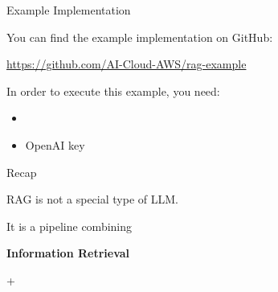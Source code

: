 \documentclass[aspectratio=169]{beamer}
\begin{document}
\begin{fragile}{Example Implementation}

You can find the example implementation on GitHub: 

\url{https://github.com/AI-Cloud-AWS/rag-example}

In order to execute this example, you need:
    \begin{itemize}
        \item 
        \item OpenAI key 
    \end{itemize}




\begin{frame}{Recap}

\begin{center}

\Huge
RAG is not a special type of LLM.

\vspace{0.5cm}

\Large
It is a pipeline combining

\vspace{0.3cm}

\textbf{Information Retrieval}

\vspace{0.2cm}

+

\vspace{0.2cm}


\end{center}
\end{frame}
\end{fragile}
\end{document}
